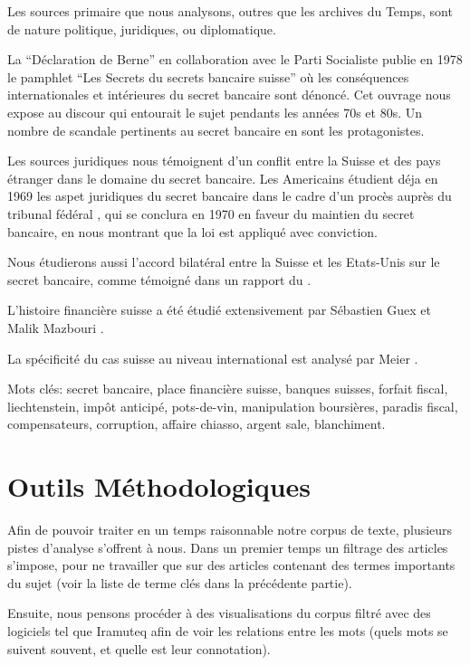 \documentclass[11pt]{article}
\begin{document}
Les sources primaire que nous analysons, outres que les archives du Temps, sont
de nature politique, juridiques, ou diplomatique.

La “Déclaration de Berne” en collaboration avec le
Parti Socialiste publie en 1978 le pamphlet “Les Secrets du secrets bancaire
suisse” \citep{GiovanniniPierLuigi1978Lsds} où les conséquences internationales
et intérieures du secret bancaire sont dénoncé. Cet ouvrage nous expose au
discour qui entourait le sujet pendants les années 70s et 80s. Un nombre de
scandale pertinents au secret bancaire en sont les protagonistes.

Les sources juridiques nous témoignent d'un conflit entre la Suisse et des pays
étranger dans le domaine du secret bancaire.  Les Americains étudient déja en
1969 les aspet juridiques du secret bancaire\citep{Mueller69} dans le cadre
d'un procès auprès du tribunal fédéral \citep{tribunalFederal70}, qui se
conclura en 1970 en faveur du maintien du secret bancaire, en nous montrant que
la loi est appliqué avec conviction.

Nous étudierons aussi l'accord bilatéral entre la Suisse et les Etats-Unis sur
le secret bancaire, comme témoigné dans un rapport du \citet{insiderTrading83}.

L’histoire financière suisse a été étudié extensivement par Sébastien Guex et
Malik Mazbouri \citep{Guex99} \citep{Guex00} \citep{Mazbouri12}.

La spécificité du cas suisse au niveau international est analysé par
Meier \citep{Meier12}.

Mots clés: secret bancaire, place financière suisse, banques suisses, forfait
fiscal, liechtenstein, impôt anticipé, pots-de-vin, manipulation boursières,
paradis fiscal, compensateurs, corruption, affaire chiasso, argent sale,
blanchiment.

\section{Outils Méthodologiques}

Afin de pouvoir traiter en un temps raisonnable notre corpus de texte, plusieurs
pistes d’analyse s’offrent à nous. Dans un premier temps un filtrage des
articles s’impose, pour ne travailler que sur des articles contenant des termes
importants du sujet (voir la liste de terme clés dans la précédente partie).

Ensuite, nous pensons procéder à des visualisations du corpus filtré avec des
logiciels tel que Iramuteq afin de voir les relations entre les mots (quels mots
se suivent souvent, et quelle est leur connotation).
\end{document}
